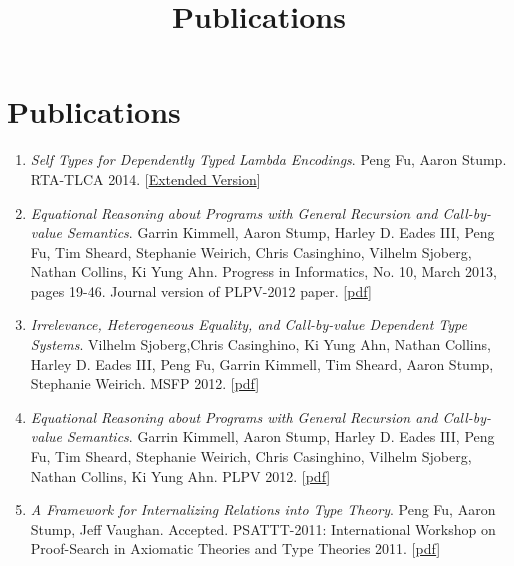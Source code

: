 \documentclass[10pt]{article}
\title{\bfseries\Large Publications}
\date{}
\begin{document}
\maketitle
\vspace{-4em}

\vspace{20pt}





\section*{Publications}

\begin{enumerate}
\item \textit{Self Types for Dependently Typed Lambda Encodings}. Peng Fu, Aaron Stump. RTA-TLCA 2014. [\href{../../document/papers/rta-tlca.pdf}{Extended Version}]
\item \textit{Equational Reasoning about Programs with General Recursion and Call-by-value Semantics}. Garrin Kimmell, Aaron Stump, Harley D. Eades III, Peng Fu, Tim Sheard, Stephanie Weirich, Chris Casinghino, Vilhelm Sjoberg, Nathan Collins, Ki Yung Ahn. Progress in Informatics, No. 10, March 2013, pages 19-46. Journal version of PLPV-2012 paper. [\href{../../document/papers/pi13.pdf}{pdf}] 
\item \textit{Irrelevance, Heterogeneous Equality, and Call-by-value Dependent Type Systems}. Vilhelm Sjoberg,Chris Casinghino, Ki Yung Ahn, Nathan Collins, Harley D. Eades III, Peng Fu, Garrin Kimmell, Tim Sheard, Aaron Stump, Stephanie Weirich. MSFP 2012. [\href{../../document/papers/msfp12.pdf}{pdf}] 
\item \textit{Equational Reasoning about Programs with General Recursion and Call-by-value Semantics}. Garrin Kimmell, Aaron Stump, Harley D. Eades III, Peng Fu, Tim Sheard, Stephanie Weirich, Chris Casinghino, Vilhelm Sjoberg, Nathan Collins, Ki Yung Ahn. PLPV 2012. [\href{../../document/papers/plpv12.pdf}{pdf}] 

\item \textit{A Framework for Internalizing Relations into Type Theory}. Peng Fu, Aaron Stump, Jeff Vaughan. Accepted. PSATTT-2011: International Workshop on Proof-Search in Axiomatic Theories and Type Theories 2011. [\href{../../document/papers/psattt-paper.pdf}{pdf}]
  
\end{enumerate}
\end{document}
